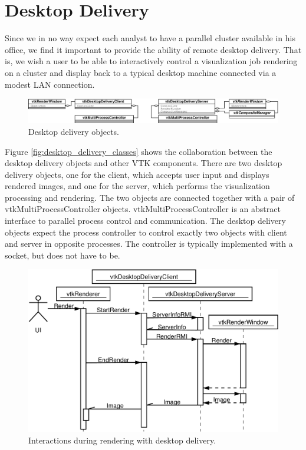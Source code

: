 \documentclass[twocolumn]{article}
\begin{document}
  \section{Desktop Delivery}
  \label{sec:desktop_delivery}

  Since we in no way expect each analyst to have a parallel cluster
  available in his office, we find it important to provide the ability of
  remote desktop delivery.  That is, we wish a user to be able to
  interactively control a visualization job rendering on a cluster and
  display back to a typical desktop machine connected via a modest LAN
  connection.

  \begin{figure}
    \begin{center}
      \includegraphics[width=\textwidth]{images/DesktopDeliveryClasses}
    \end{center}
    \caption{Desktop delivery objects.}
    \label{fig:desktop_delivery_classes}
  \end{figure}

  Figure \vref{fig:desktop_delivery_classes} shows the collaboration
  between the desktop delivery objects and other VTK components.  There are
  two desktop delivery objects, one for the client, which accepts user
  input and displays rendered images, and one for the server, which
  performs the visualization processing and rendering.  The two objects are
  connected together with a pair of vtkMultiProcessController objects.
  vtkMultiProcessController is an abstract interface to parallel process
  control and communication.  The desktop delivery objects expect the
  process controller to control exactly two objects with client and server
  in opposite processes.  The controller is typically implemented with a
  socket, but does not have to be.

  \begin{figure}[ht]
    \begin{center}
      \includegraphics[width=\linewidth]{images/DesktopDeliveryInteraction}
      \caption{Interactions during rendering with desktop delivery.}
      \label{fig:desktop_delivery_interaction}
    \end{center}
  \end{figure}
\end{document}
